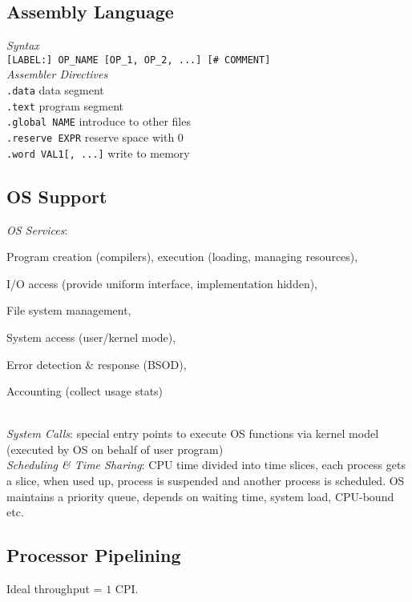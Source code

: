 \subsection*{Assembly Language}
\emph{Syntax}\\
\texttt{[LABEL:] OP\_NAME [OP\_1, OP\_2, ...] [\# COMMENT]}\\
\emph{Assembler Directives}\\
\texttt{.data} \hfill data segment\\
\texttt{.text} \hfill program segment\\
\texttt{.global NAME} \hfill introduce to other files\\
\texttt{.reserve EXPR} \hfill reserve space with 0\\
\texttt{.word VAL1[, ...]} \hfill write to memory\\

\subsection*{OS Support}
\emph{OS Services}: \begin{enuminline}
    \item Program creation (compilers), execution (loading, managing resources),
    \item I/O access (provide uniform interface, implementation hidden),
    \item File system management,
    \item System access (user/kernel mode),
    \item Error detection \& response (BSOD),
    \item Accounting (collect usage stats)
\end{enuminline} \\
\emph{System Calls}: special entry points to execute OS functions via kernel model
(executed by OS on behalf of user program)\\
\emph{Scheduling \& Time Sharing}: CPU time divided into time slices, each process gets a slice,
when used up, process is suspended and another process is scheduled.
OS maintains a priority queue, depends on waiting time, system load, CPU-bound etc.

\subsection*{Processor Pipelining}
Ideal throughput = $1 \text{ CPI}$.

